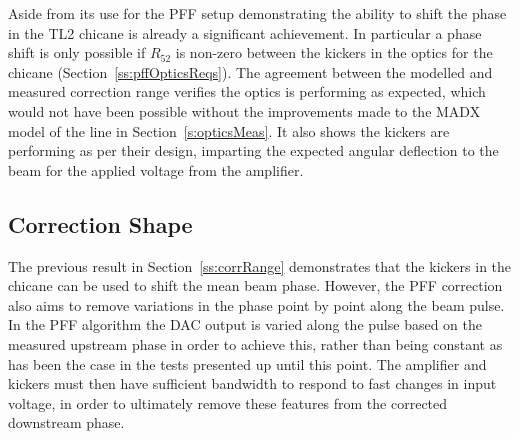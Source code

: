 Aside from its use for the PFF setup demonstrating the ability
 to shift the phase in the TL2 chicane is already a significant 
 achievement. In particular a phase shift is only possible if 
 \(R_{52}\) is non-zero between the kickers in the optics for the
 chicane (Section~\ref{ss:pffOpticsReqs}). The agreement between the
 modelled and measured correction range verifies the optics is 
 performing as expected, which would not have been possible without
 the improvements made to the MADX model of the line in
 Section~\ref{s:opticsMeas}. It also shows the kickers are performing
 as per their design, imparting the expected angular deflection to
 the beam for the applied voltage from the amplifier.

%
%

\subsection{Correction Shape}
\label{ss:kickShape}

The previous result in Section~\ref{ss:corrRange} demonstrates that the kickers in the chicane can be used to shift the mean beam phase. However, the PFF correction also aims to remove variations in the phase point by point along the beam pulse. In the PFF algorithm the DAC output is varied along the pulse based on the measured upstream phase in order to achieve this, rather than being constant as has been the case in the tests presented up until this point. The amplifier and kickers must then have sufficient bandwidth to respond to fast changes in input voltage, in order to ultimately remove these features from the corrected downstream phase.

